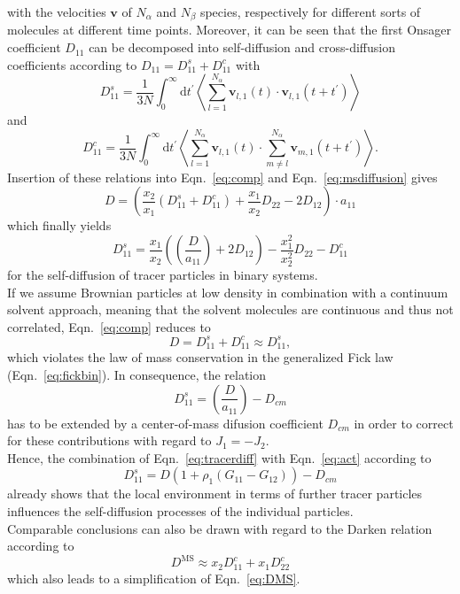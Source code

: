 \documentclass[aip,jcp,reprint]{revtex4-1}
\begin{document}
with the velocities $\mathbf{v}$ of $N_{\alpha}$ and $N_{\beta}$ species, respectively for different sorts of molecules at different time points.
Moreover, it can be seen that the first Onsager coefficient $D_{11}$  can be decomposed into self-diffusion and cross-diffusion coefficients according to $D_{11} = D_{11}^s + D_{11}^c$ with
\begin{equation}
D_{11}^s= \frac{1}{3N}\int_0^{\infty}\textrm{d}t^{\prime}\left \langle \sum_{l=1}^{N_{\alpha}}\mathbf{v}_{l,1}(t)\cdot \mathbf{v}_{l,1}(t+t^{\prime})\right\rangle
\end{equation}
and 
\begin{equation}
D_{11}^c= \frac{1}{3N}\int_0^{\infty}\textrm{d}t^{\prime}\left \langle \sum_{l=1}^{N_{\alpha}}\mathbf{v}_{l,1}(t)\cdot \sum_{m\neq l}^{N_{\alpha}}\mathbf{v}_{m,1}(t+t^{\prime})\right\rangle.
\end{equation}
Insertion of these relations into Eqn.~\eqref{eq:comp} and Eqn.~\eqref{eq:msdiffusion} gives
\begin{equation}
D= \left(\frac{x_2}{x_1}(D_{11}^s+D_{11}^c) + \frac{x_1}{x_2}D_{22} - 2D_{12}\right)\cdot a_{11} 
\end{equation} 
which finally yields 
\begin{equation}
\label{eq:tracer}
D_{11}^s = \frac{x_1}{x_2}\left(\left(\frac{D}{a_{11}}\right)+2D_{12}\right)-\frac{x_1^2}{x_2^2}D_{22}-D_{11}^c
\end{equation}
for the self-diffusion of tracer particles in binary systems.\\
If we assume Brownian particles at low density in combination with a continuum solvent approach, meaning that the solvent molecules are continuous and thus not correlated, Eqn.~\eqref{eq:comp} reduces to
\begin{equation}
D = D_{11}^s+D_{11}^c \approx D_{11}^s,
\end{equation}
which violates the law of mass conservation in the generalized Fick law (Eqn.~\eqref{eq:fickbin}). In consequence, the relation
\begin{equation}
\label{eq:tracerdiff}
D_{11}^s = \left(\frac{D}{a_{11}}\right) - D_{cm}
\end{equation}
has to be extended by a center-of-mass difusion coefficient $D_{cm}$  in order to correct for these contributions with regard to $J_1 = - J_2$. \\
Hence, the combination of Eqn.~\eqref{eq:tracerdiff}  with Eqn.~\eqref{eq:act} according to
\begin{equation}
D_{11}^s = D(1+\rho_1(G_{11}-G_{12})) - D_{cm}
\end{equation}
already shows that the local environment in terms of further tracer particles influences the self-diffusion processes of the individual particles.  \\
Comparable conclusions can also be drawn with regard to the Darken relation \cite{rosenberger20a,liu11a,liu13a,darken48a} according to 
\begin{equation}
D^{\text{MS}} \approx x_2 D_{11}^c + x_1 D_{22}^c
\end{equation}
which also leads to a simplification of Eqn.~\eqref{eq:DMS}. 
\end{document}
